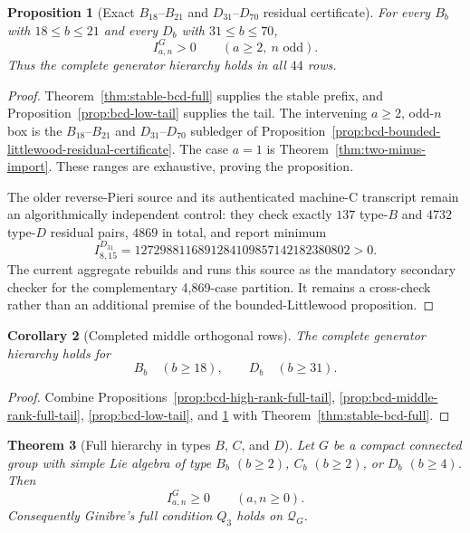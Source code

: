 \documentclass[11pt,reqno]{amsart}
\theoremstyle{plain}
\newtheorem{theorem}{Theorem}[section]
\newtheorem{proposition}[theorem]{Proposition}
\newtheorem{corollary}[theorem]{Corollary}
\theoremstyle{definition}
\newcommand{\Qcone}{\mathcal Q}
\begin{document}
\begin{proposition}[Exact $B_{18}$--$B_{21}$ and
$D_{31}$--$D_{70}$ residual certificate]
\label{prop:bd-finite-residual-certificate}
For every $B_b$ with $18\leq b\leq21$ and every $D_b$ with
$31\leq b\leq70$,
\[
 I^G_{a,n}>0\qquad(a\geq2,\ n\text{ odd}).
\]
Thus the complete generator hierarchy holds in all $44$ rows.
\end{proposition}

\begin{proof}
Theorem~\ref{thm:stable-bcd-full} supplies the stable prefix, and
Proposition~\ref{prop:bcd-low-tail} supplies the tail.  The intervening
$a\ge2$, odd-$n$ box is the $B_{18}$--$B_{21}$ and
$D_{31}$--$D_{70}$ subledger of
Proposition~\ref{prop:bcd-bounded-littlewood-residual-certificate}.
The case $a=1$ is Theorem~\ref{thm:two-minus-import}.  These ranges are
exhaustive, proving the proposition.

The older reverse-Pieri source
 and its
authenticated machine-C transcript remain an algorithmically independent
control: they check exactly $137$ type-$B$ and $4732$ type-$D$ residual
pairs, $4869$ in total, and report
minimum
\[
 I^{D_{31}}_{8,15}
 =1272988116891284109857142182380802>0.
\]
The current aggregate rebuilds and runs this source as the mandatory
secondary checker for the complementary 4,869-case partition.  It remains a
cross-check rather than an additional premise of the bounded-Littlewood
proposition.
\end{proof}

\begin{corollary}[Completed middle orthogonal rows]
\label{cor:completed-middle-orthogonal-rows}
The complete generator hierarchy holds for
\[
 B_b\quad(b\geq18),\qquad D_b\quad(b\geq31).
\]
\end{corollary}

\begin{proof}
Combine Propositions~\ref{prop:bcd-high-rank-full-tail},
\ref{prop:bcd-middle-rank-full-tail},
\ref{prop:bcd-low-tail}, and
\ref{prop:bd-finite-residual-certificate} with
Theorem~\ref{thm:stable-bcd-full}.
\end{proof}

\begin{theorem}[Full hierarchy in types $B$, $C$, and $D$]
\label{thm:bcd-full-hierarchy}
Let $G$ be a compact connected group with simple Lie algebra of type
$B_b$ $(b\geq2)$, $C_b$ $(b\geq2)$, or $D_b$ $(b\geq4)$.  Then
\[
 I^G_{a,n}\geq0\qquad(a,n\geq0).
\]
Consequently Ginibre's full condition $Q_3$ holds on $\Qcone_G$.
\end{theorem}
\end{document}
